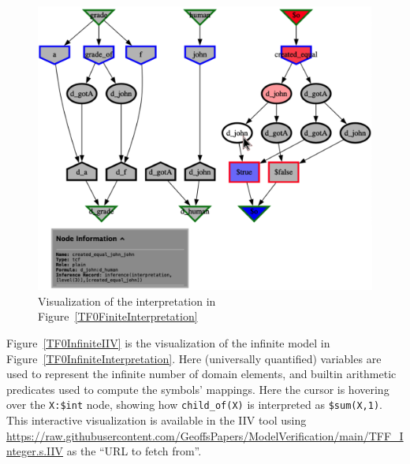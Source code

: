 \documentclass[letterpaper]{article}
\newcommand{\smalltt}[1]{\small \texttt{#1}}
\begin{document}
\begin{figure}[htbp]
\includegraphics[width=\columnwidth]{TFF_Finite.s.IIV.pdf}
\caption{Visualization of the interpretation in Figure~\ref{TF0FiniteInterpretation}}
\label{TF0FiniteIIV}
\end{figure}

Figure~\ref{TF0InfiniteIIV} is the visualization of the infinite model in 
Figure~\ref{TF0InfiniteInterpretation}. 
Here (universally quantified) variables are used to represent the infinite number of
domain elements, and builtin arithmetic predicates used to compute the symbols' mappings.
Here the cursor is hovering over the {\smalltt{X:\$int}} node, showing how 
{\smalltt{child\_of(X)}} is interpreted as {\smalltt{\$sum(X,1)}}.
This interactive visualization is available in the IIV tool using 
{\scriptsize \url{https://raw.githubusercontent.com/GeoffsPapers/ModelVerification/main/TFF_Integer.s.IIV}}
as the ``URL to fetch from''.
\end{document}
